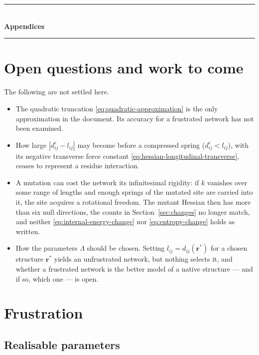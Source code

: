 \documentclass[11pt]{article}
\newcommand{\rr}{\mathbf{r}}
\newcommand{\LL}{\Lambda}
\newcommand{\dije}{d^{e}_{ij}}
\newcommand{\lij}{l_{ij}}
\newcommand{\dij}{d_{ij}}
\begin{document}
\clearpage
\appendix
\begin{center}
\rule{\textwidth}{0.4pt}\\[2pt]
{\Large\bfseries Appendices}\\[-6pt]
\rule{\textwidth}{0.4pt}
\end{center}
\bigskip


\section{Open questions and work to come}
\label{sec:open}

The following are not settled here.

\begin{itemize}
\item The quadratic truncation \eqref{eq:quadratic-approximation} is the only approximation in
the document. Its accuracy for a frustrated network has not been examined.
\item How large $|\dije - \lij|$ may become before a compressed spring
($\dije < \lij$), with its negative transverse force constant
\eqref{eq:hessian-longitudinal-transverse}, ceases to represent a residue
interaction.
\item A mutation can cost the network its infinitesimal rigidity: if $k$ vanishes
over some range of lengths and enough springs of the mutated site are carried into
it, the site acquires a rotational freedom. The mutant Hessian then has more than
six null directions, the counts in Section~\ref{sec:changes} no longer match, and
neither \eqref{eq:internal-energy-change} nor \eqref{eq:entropy-change} holds as
written.
\item How the parameters $\LL$ should be chosen. Setting
$\lij = \dij(\rr^{\ast})$ for a chosen structure $\rr^{\ast}$ yields an
unfrustrated network, but nothing selects it, and whether a frustrated network is
the better model of a native structure --- and if so, which one --- is open.
\end{itemize}

\section{Frustration}
\label{app:frustration}

\subsection*{Realisable parameters}
\end{document}
